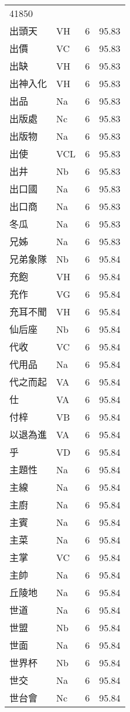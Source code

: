 \documentclass[twocolumn]{book}
\begin{document}
\begin{supertabular}{llrr}
41850\\
出頭天 & VH & 6 &  95.83\\
出價 & VC & 6 &  95.83\\
出缺 & VH & 6 &  95.83\\
出神入化 & VH & 6 &  95.83\\
出品 & Na & 6 &  95.83\\
出版處 & Nc & 6 &  95.83\\
出版物 & Na & 6 &  95.83\\
出使 & VCL & 6 &  95.83\\
出井 & Nb & 6 &  95.83\\
出口國 & Na & 6 &  95.83\\
出口商 & Na & 6 &  95.83\\
冬瓜 & Na & 6 &  95.83\\
兄姊 & Na & 6 &  95.83\\
兄弟象隊 & Nb & 6 &  95.84\\
充飽 & VH & 6 &  95.84\\
充作 & VG & 6 &  95.84\\
充耳不聞 & VH & 6 &  95.84\\
仙后座 & Nb & 6 &  95.84\\
代收 & VC & 6 &  95.84\\
代用品 & Na & 6 &  95.84\\
代之而起 & VA & 6 &  95.84\\
仕 & VA & 6 &  95.84\\
付梓 & VB & 6 &  95.84\\
以退為進 & VA & 6 &  95.84\\
乎 & VD & 6 &  95.84\\
主題性 & Na & 6 &  95.84\\
主線 & Na & 6 &  95.84\\
主廚 & Na & 6 &  95.84\\
主賓 & Na & 6 &  95.84\\
主菜 & Na & 6 &  95.84\\
主掌 & VC & 6 &  95.84\\
主帥 & Na & 6 &  95.84\\
丘陵地 & Na & 6 &  95.84\\
世道 & Na & 6 &  95.84\\
世盟 & Nb & 6 &  95.84\\
世面 & Na & 6 &  95.84\\
世界杯 & Nb & 6 &  95.84\\
世交 & Na & 6 &  95.84\\
世台會 & Nc & 6 &  95.84\\

\end{supertabular}
\end{document}
